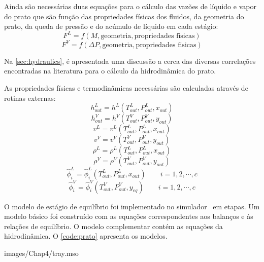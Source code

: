 
Ainda são necessárias duas equações para o cálculo das vazões de líquido e vapor do prato que são função
das propriedades físicas dos fluidos, da geometria do prato, da queda de pressão e do acúmulo de líquido
em cada estágio:
\begin{equation}
F^L = f(M, \textrm{geometria}, \textrm{propriedades fisicas})
\end{equation}
\begin{equation}
F^V = f(\Delta P, \textrm{geometria}, \textrm{propriedades fisicas})
\end{equation}

Na \autoref{sec:hydraulics}, é apresentada uma discussão a cerca das
diversas correlações encontradas na literatura para o cálculo da hidrodinâmica do prato.

As propriedades físicas e termodinâmicas necessárias são calculadas através de rotinas externas:
\begin{equation}
h_{out}^L = h^L(T_{out}^L, P_{out}^L, x_{out})
\end{equation}
\begin{equation}
h_{out}^V = h^V(T_{out}^V, P_{out}^V, y_{out})
\end{equation}
\begin{equation}
v^L = v^L(T_{out}^L, P_{out}^L, x_{out})
\end{equation}
\begin{equation}
v^V = v^V(T_{out}^V, P_{out}^V, y_{out})
\end{equation}
\begin{equation}
\rho^L = \rho^L(T_{out}^L, P_{out}^L, x_{out})
\end{equation}
\begin{equation}
\rho^V = \rho^V(T_{out}^V, P_{out}^V, y_{out})
\end{equation}
\begin{equation}
\hat{\phi}_i^L = \hat{\phi}_i^L(T_{out}^L, P_{out}^L, x_{out})  \qquad
i=1,2,\cdots,c
\end{equation}
\begin{equation}
\hat{\phi}_i^V = \hat{\phi}_i^V(T_{out}^V, P_{out}^V, y_{eq}) \qquad
i=1,2,\cdots,c
\end{equation}

O modelo de estágio de equilíbrio foi implementado no simulador \emso\ em etapas. Um modelo básico foi construído com as
equações correspondentes aos balanços e às relações de equilíbrio. O modelo complementar contém as equações da
hidrodinâmica. O \autoref{code:prato} apresenta os modelos.

{images/Chap4/tray.mso}

